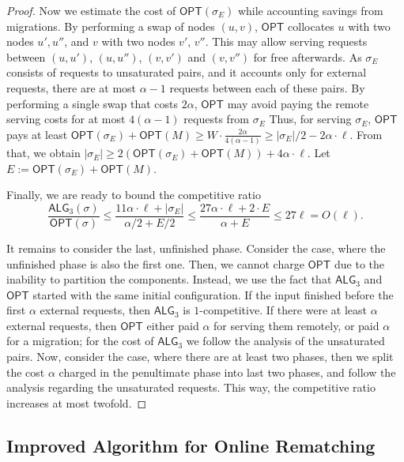 \documentclass[manuscript,screen=true, review, anonymous]{acmart}
\newcommand{\OPT}{\textsf{OPT}\xspace}
\newcommand{\TAlg}{{\ensuremath{\textsf{ALG}_{3}}}\xspace}
\begin{document}
\begin{proof}
	
	Now we estimate the cost of $\OPT(\sigma_E)$ while accounting savings from migrations.
	By performing a swap of nodes $(u,v)$, $\OPT$ collocates $u$ with two nodes $u', u''$, and $v$ with two nodes $v'$, $v''$.
	This may allow serving requests between $(u,u')$, $(u,u'')$, $(v,v')$ and $(v,v'')$ for free afterwards.
	As $\sigma_E$ consists of requests to unsaturated pairs, and it accounts only for external requests, there are at most $\alpha-1$ requests between each of these pairs.
	By performing a single swap that costs $2\alpha$, $\OPT$ may avoid paying the remote serving costs for at most $4 (\alpha - 1)$ requests from $\sigma_E$
	Thus, for serving $\sigma_E$, $\OPT$ pays at least $\OPT(\sigma_E) + \OPT(M) \geq W \cdot \frac{2\alpha}{4 (\alpha-1)}\geq |\sigma_E| / 2 - 2 \alpha \cdot \ell$.
	From that, we obtain $|\sigma_E| \geq 2(\OPT(\sigma_E)+\OPT(M)) + 4\alpha \cdot \ell$.
	Let $E := \OPT(\sigma_E) + \OPT(M)$.
	
	Finally, we are ready to bound the competitive ratio
	\begin{equation*}
		\frac{\TAlg(\sigma)}{\OPT(\sigma)} \leq \frac{11\alpha \cdot \ell + |\sigma_E|}{\alpha/2 + E/2} \leq \frac{27\alpha\cdot\ell + 2\cdot E}{\alpha + E} \leq 27 \ell = O(\ell).
	\end{equation*}
	
	\medskip
	
	It remains to consider the last, unfinished phase.
	Consider the case, where the unfinished phase is also the first one.
	Then, we cannot charge $\OPT$ due to the inability to partition the components.
	Instead, we use the fact that \TAlg and $\OPT$ started with the same initial configuration.
	If the input finished before the first $\alpha$ external requests, then \TAlg is $1$-competitive.
	If there were at least $\alpha$ external requests, then $\OPT$ either paid $\alpha$ for serving them remotely, or paid $\alpha$ for a migration; for the cost of \TAlg we follow the analysis of the unsaturated pairs.
	Now, consider the case, where there are at least two phases, then we split the cost $\alpha$ charged in the penultimate phase into last two phases, and follow the analysis regarding the unsaturated requests.
	This way, the competitive ratio increases at most twofold.
\end{proof}





\subsection{Improved Algorithm for Online Rematching}
\label{sec:k2}
\end{document}
